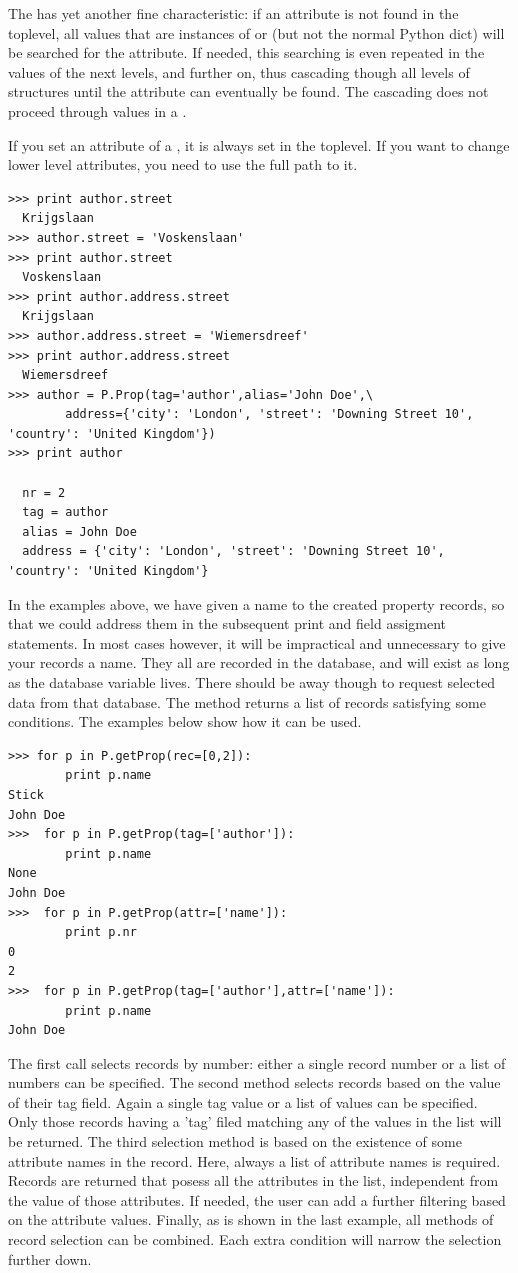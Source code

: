 The  has yet another fine characteristic: if an attribute is not found in the toplevel, all values that are instances of  or  (but not the normal Python dict) will be searched for the attribute. If needed, this searching is even repeated in the values of the next levels, and further on, thus cascading though all levels of  structures until the attribute can eventually be found. The cascading does not proceed through values in a .

If you set an attribute of a , it is always set in the toplevel. If you want to change lower level attributes, you need to use the full path to it.
\begin{verbatim}
>>> print author.street
  Krijgslaan
>>> author.street = 'Voskenslaan'
>>> print author.street
  Voskenslaan
>>> print author.address.street
  Krijgslaan
>>> author.address.street = 'Wiemersdreef'
>>> print author.address.street
  Wiemersdreef
>>> author = P.Prop(tag='author',alias='John Doe',\
        address={'city': 'London', 'street': 'Downing Street 10', 'country': 'United Kingdom'})
>>> print author

  nr = 2
  tag = author
  alias = John Doe
  address = {'city': 'London', 'street': 'Downing Street 10', 'country': 'United Kingdom'} 
\end{verbatim}

In the examples above, we have given a name to the created property records, so that we could address them in the subsequent print and field assigment statements. In most cases however, it will be impractical and unnecessary to give your records a name. They all are recorded in the  database, and will exist as long as the database variable lives. There should be away though to request selected data from that database. The  method returns a list of records satisfying some conditions. The examples below show how it can be used.

\begin{verbatim}
>>> for p in P.getProp(rec=[0,2]):
        print p.name
Stick
John Doe
>>>  for p in P.getProp(tag=['author']):
        print p.name
None
John Doe
>>>  for p in P.getProp(attr=['name']):
        print p.nr
0
2
>>>  for p in P.getProp(tag=['author'],attr=['name']):
        print p.name
John Doe
\end{verbatim}
The first call selects records by number: either a single record number or a list of numbers can be specified. The second method selects records based on the value of their tag field. Again a single tag value or a list of values can be specified. Only those records having a 'tag' filed matching any of the values in the list will be returned. The third selection method is based on the existence of some attribute names in the record. Here, always a list of attribute names is required. Records are returned that posess all the attributes in the list, independent from the value of those attributes. If needed, the user can add a further filtering based on the attribute values. Finally, as is shown in the last example, all methods of record selection can be combined. Each extra condition will narrow the selection further down.


